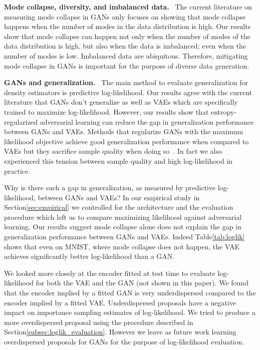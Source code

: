 \documentclass[11pt]{article}
\DeclareRobustCommand{\parhead}[1]{\textbf{#1}~}
\begin{document}
\parhead{Mode collapse, diversity, and imbalanced data.}
The current literature on measuring mode collapse in \glspl{GAN} only focuses on showing that mode collapse happens when the number of modes in the data distribution is high. 
Our results show that mode collapse can happen not only when the number of modes of the data distribution is high, but also when the data is imbalanced; even when the number of modes is low. 
Imbalanced data are ubiquitous. Therefore, mitigating mode collapse in \glspl{GAN} is important for the purpose of diverse data generation.

\parhead{\glspl{GAN} and generalization.}
The main method to evaluate generalization for density estimators is predictive log-likelihood. Our results agree with the current literature that \glspl{GAN} don't generalize as well as \glspl{VAE} which are specifically trained to maximize log-likelihood. However, our results show that entropy-regularized adversarial learning can reduce the gap in generalization performance between \glspl{GAN} and \glspl{VAE}. Methods that regularize \glspl{GAN} with the maximum likelihood objective achieve good generalization performance when compared to \glspl{VAE} but they sacrifice sample quality when doing so~\citep{grover2018flow}. In fact we also experienced this tension between sample quality and high log-likelihood in practice. 

Why is there such a gap in generalization, as measured by predictive log-likelihood, between \glspl{GAN} and \glspl{VAE}? In our empirical study in Section\nobreakspace \ref {sec:empirical} we controlled for the architecture and the evaluation procedure which left us to compare maximizing likelihood against adversarial learning. Our results suggest mode collapse alone does not explain the gap in generalization performance between \glspl{GAN} and \glspl{VAE}. Indeed Table\nobreakspace \ref {tab:loglik} shows that even on \textsc{MNIST}, where mode collapse does not happen, the \gls{VAE} achieves significantly better log-likelihood than a \gls{GAN}. 

We looked more closely at the encoder fitted at test time to evaluate log-likelihood for both the \gls{VAE} and the \gls{GAN} (not shown in this paper). We found that the encoder implied by a fitted \gls{GAN} is very underdispersed compared to the encoder implied by a fitted \gls{VAE}. Underdispersed proposals have a negative impact on importance sampling estimates of log-likelihood. We tried to produce a more overdispersed proposal using the procedure described in Section\nobreakspace \ref {subsec:loglik_evaluation}. However we leave as future work learning overdispersed proposals for \glspl{GAN} for the purpose of log-likelihood evaluation. 
\end{document}
